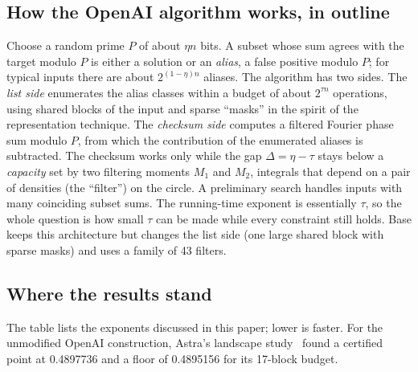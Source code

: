 \documentclass[11pt]{article}
\theoremstyle{plain}
\begin{document}
\subsection*{How the OpenAI algorithm works, in outline}
Choose a random prime $P$ of about $\eta n$ bits. A subset whose sum agrees with the target modulo $P$ is either a solution or an \emph{alias}, a false positive modulo $P$; for typical inputs there are about $2^{(1-\eta)n}$ aliases. The algorithm has two sides. The \emph{list side} enumerates the alias classes within a budget of about $2^{\tau n}$ operations, using shared blocks of the input and sparse ``masks'' in the spirit of the representation technique. The \emph{checksum side} computes a filtered Fourier phase sum modulo $P$, from which the contribution of the enumerated aliases is subtracted. The checksum works only while the gap $\Delta = \eta - \tau$ stays below a \emph{capacity} set by two filtering moments $M_1$ and $M_2$, integrals that depend on a pair of densities (the ``filter'') on the circle. A preliminary search handles inputs with many coinciding subset sums. The running-time exponent is essentially $\tau$, so the whole question is how small $\tau$ can be made while every constraint still holds. Base keeps this architecture but changes the list side (one large shared block with sparse masks) and uses a family of 43 filters.

\subsection*{Where the results stand}
The table lists the exponents discussed in this paper; lower is faster. For the unmodified OpenAI construction, Astra's landscape study~\cite{astra} found a certified point at 0.4897736 and a floor of 0.4895156 for its 17-block budget.
\end{document}

